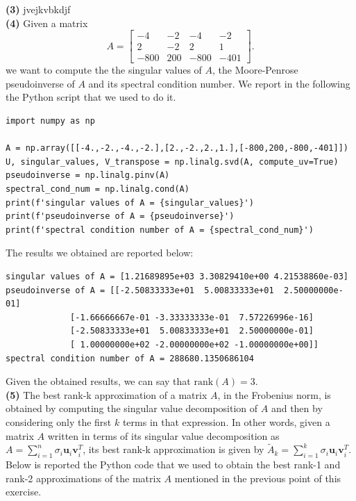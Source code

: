 \documentclass[a4paper,11pt]{article}
\begin{document}
\noindent \textbf{(3)} jvejkvbkdjf\\


\noindent \textbf{(4)} Given a matrix
\begin{equation}
	A = \begin{bmatrix}
		-4 & -2 & -4 & -2 \\
		2 & -2 & 2 & 1 \\
		-800 & 200 & -800 & -401
	\end{bmatrix}.
\end{equation}
we want to compute the the singular values of $A$, the Moore-Penrose pseudoinverse of $A$ and its spectral condition number. We report in the following the Python script that we used to do it.

\begin{verbatim}
import numpy as np

A = np.array([[-4.,-2.,-4.,-2.],[2.,-2.,2.,1.],[-800,200,-800,-401]])
U, singular_values, V_transpose = np.linalg.svd(A, compute_uv=True)
pseudoinverse = np.linalg.pinv(A)
spectral_cond_num = np.linalg.cond(A)
print(f'singular values of A = {singular_values}')
print(f'pseudoinverse of A = {pseudoinverse}')
print(f'spectral condition number of A = {spectral_cond_num}')
\end{verbatim}

\noindent The results we obtained are reported below:

\begin{verbatim}
singular values of A = [1.21689895e+03 3.30829410e+00 4.21538860e-03]
pseudoinverse of A = [[-2.50833333e+01  5.00833333e+01  2.50000000e-01]
		     [-1.66666667e-01 -3.33333333e-01  7.57226996e-16]
		     [-2.50833333e+01  5.00833333e+01  2.50000000e-01]
		     [ 1.00000000e+02 -2.00000000e+02 -1.00000000e+00]]
spectral condition number of A = 288680.1350686104
\end{verbatim}

\noindent Given the obtained results, we can say that $\text{rank}(A)=3$.\\

\noindent \textbf{(5)} The best rank-k approximation of a matrix $A$, in the Frobenius norm, is obtained by computing the singular value decomposition of $A$ and then by considering only the first $k$ terms in that expression. In other words, given a matrix $A$ written in terms of its singular value decomposition as $A = \sum_{i=1}^{n}\sigma_{i}\textbf{u}_{i}\textbf{v}_{i}^{T}$, its best rank-k approximation is given by $\tilde{A}_{k} = \sum_{i=1}^{k}\sigma_{i}\textbf{u}_{i}\textbf{v}_{i}^{T}$. Below is reported the Python code that we used to obtain the best rank-1 and rank-2 approximations of the matrix $A$ mentioned in the previous point of this exercise.
\end{document}
